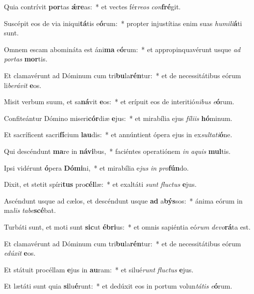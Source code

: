 \item Quia contrívit \textbf{por}tas \textbf{ǽ}\textbf{re}as:~* et vectes fér\textit{re}\textit{os} \textit{con}\textbf{fré}git.
\item Suscépit eos de via iniqui\textbf{tá}tis e\textbf{ó}rum:~* propter injustítias enim suas \textit{hu}\textit{mi}\textit{li}\textbf{á}ti sunt.
\item Omnem escam abomináta est áni\textbf{ma} e\textbf{ó}rum:~* et appropinquavérunt usque \textit{ad} \textit{por}\textit{tas} \textbf{mor}tis.
\item Et clamavérunt ad Dóminum cum tri\textbf{bu}la\textbf{rén}tur:~* et de necessitátibus eórum li\textit{be}\textit{rá}\textit{vit} \textbf{e}os.
\item Misit verbum suum, et sa\textbf{ná}vit \textbf{e}os:~* et erípuit eos de interitió\textit{ni}\textit{bus} \textit{e}\textbf{ó}rum.
\item Confiteántur Dómino miseri\textbf{cór}diæ \textbf{e}jus:~* et mirabília ejus \textit{fí}\textit{li}\textit{is} \textbf{hó}minum.
\item Et sacríficent sacri\textbf{fí}cium \textbf{lau}dis:~* et annúntient ópera ejus in ex\textit{sul}\textit{ta}\textit{ti}\textbf{ó}ne.
\item Qui descéndunt \textbf{ma}re in \textbf{ná}\textbf{vi}bus,~* faciéntes operatiónem \textit{in} \textit{a}\textit{quis} \textbf{mul}tis.
\item Ipsi vidérunt \textbf{ó}pera \textbf{Dó}\textbf{mi}ni,~* et mirabília e\textit{jus} \textit{in} \textit{pro}\textbf{fún}do.
\item Dixit, et stetit spíri\textbf{tus} pro\textbf{cél}læ:~* et exaltáti \textit{sunt} \textit{fluc}\textit{tus} \textbf{e}jus.
\item Ascéndunt usque ad cælos, et descéndunt usque \textbf{ad} a\textbf{býs}sos:~* ánima eórum in ma\textit{lis} \textit{ta}\textit{be}\textbf{scé}bat.
\item Turbáti sunt, et moti sunt \textbf{sic}ut \textbf{é}\textbf{bri}us:~* et omnis sapiéntia eó\textit{rum} \textit{de}\textit{vo}\textbf{rá}ta est.
\item Et clamavérunt ad Dóminum cum tri\textbf{bu}la\textbf{rén}tur:~* et de necessitátibus eórum \textit{e}\textit{dú}\textit{xit} \textbf{e}os.
\item Et státuit procéllam \textbf{e}jus in \textbf{au}ram:~* et silué\textit{runt} \textit{fluc}\textit{tus} \textbf{e}jus.
\item Et lætáti sunt quia \textbf{si}lu\textbf{é}runt:~* et dedúxit eos in portum volun\textit{tá}\textit{tis} \textit{e}\textbf{ó}rum.
